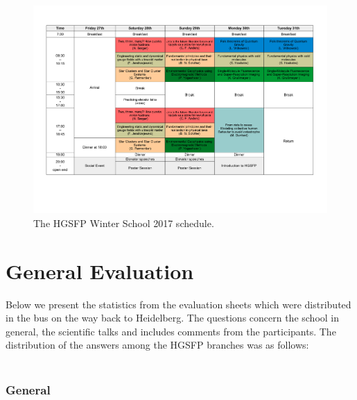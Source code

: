 \documentclass[11pt,a4paper]{article}
\numberwithin{equation}{section}
\numberwithin{table}{section}\setlength{\multlinegap}{25pt}
\begin{document}
\begin{figure}[H]
\centering
\includegraphics[angle=90,width=0.999\textwidth]{FinalProgram.pdf}
\caption{The HGSFP Winter School 2017 schedule.}
\end{figure}
\newpage
\section{General Evaluation}
Below we present the statistics from the evaluation sheets which were distributed in the bus on the way back to Heidelberg. The questions concern the school in general, the scientific talks and includes comments from the participants. The distribution of the answers among the HGSFP branches was as follows: \\ \\

\subsubsection{General}
\end{document}
